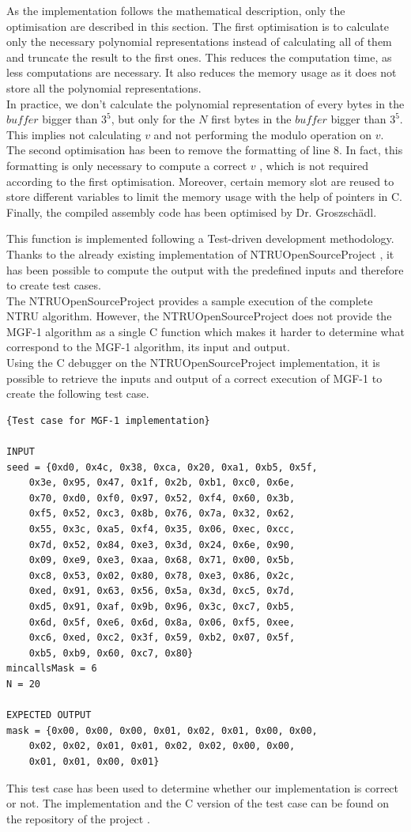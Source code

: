 As the implementation follows the mathematical description, only the optimisation are described in this section.
The first optimisation is to calculate only the necessary polynomial representations instead of calculating all of them and truncate the result to the first ones. This reduces the computation time, as less computations are necessary. It also reduces the memory usage as it does not store all the polynomial representations.\\ In practice, we don't calculate the polynomial representation of every bytes in the $buffer$ bigger than $3^5$, but only for the $N$ first bytes in the $buffer$ bigger than $3^5$. This implies not calculating $v$ and not performing the modulo operation on $v$.\\ 
The second optimisation has been to remove the formatting of line 8. In fact, this formatting is only necessary to compute a correct $v$ %
, which is not required according to the first optimisation.
Moreover, certain memory slot are reused to store different variables to limit the memory usage with the help of pointers in C.
Finally, the compiled assembly code has been optimised by Dr. Groszsch\"adl.


This function is implemented following a Test-driven development methodology. Thanks to the already existing implementation of NTRUOpenSourceProject \cite{noauthor_open_2018}, it has been possible to compute the output with the predefined inputs and therefore to create test cases.\\ The NTRUOpenSourceProject provides a sample execution of the complete NTRU algorithm. However, the NTRUOpenSourceProject does not provide the MGF-1 algorithm as a single C function which makes it harder to determine what correspond to the MGF-1 algorithm, its input and output.\\ Using the C debugger on the NTRUOpenSourceProject implementation, it is possible to retrieve the inputs and output of a correct execution of MGF-1 to create the following test case.
\newpage
\begin{lstlisting}[style=base,frame=single,mathescape=true]
{Test case for MGF-1 implementation}

INPUT 
seed = {0xd0, 0x4c, 0x38, 0xca, 0x20, 0xa1, 0xb5, 0x5f,
	0x3e, 0x95, 0x47, 0x1f, 0x2b, 0xb1, 0xc0, 0x6e,
	0x70, 0xd0, 0xf0, 0x97, 0x52, 0xf4, 0x60, 0x3b,
	0xf5, 0x52, 0xc3, 0x8b, 0x76, 0x7a, 0x32, 0x62,
	0x55, 0x3c, 0xa5, 0xf4, 0x35, 0x06, 0xec, 0xcc,
	0x7d, 0x52, 0x84, 0xe3, 0x3d, 0x24, 0x6e, 0x90,
	0x09, 0xe9, 0xe3, 0xaa, 0x68, 0x71, 0x00, 0x5b,
	0xc8, 0x53, 0x02, 0x80, 0x78, 0xe3, 0x86, 0x2c,
	0xed, 0x91, 0x63, 0x56, 0x5a, 0x3d, 0xc5, 0x7d,
	0xd5, 0x91, 0xaf, 0x9b, 0x96, 0x3c, 0xc7, 0xb5,
	0x6d, 0x5f, 0xe6, 0x6d, 0x8a, 0x06, 0xf5, 0xee,
	0xc6, 0xed, 0xc2, 0x3f, 0x59, 0xb2, 0x07, 0x5f,
	0xb5, 0xb9, 0x60, 0xc7, 0x80}
mincallsMask = 6
N = 20

EXPECTED OUTPUT
mask = {0x00, 0x00, 0x00, 0x01, 0x02, 0x01, 0x00, 0x00, 
	0x02, 0x02, 0x01, 0x01, 0x02, 0x02, 0x00, 0x00,
	0x01, 0x01, 0x00, 0x01}
\end{lstlisting}

This test case has been used to determine whether our implementation is correct or not. The implementation and the C version of the test case can be found on the repository of the project \cite{simonetto_ntru_2018}.







